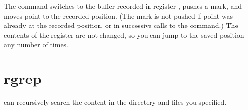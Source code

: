 The command  switches to the buffer recorded in register , pushes a mark, and moves point to the recorded position.
(The mark is not pushed if point was already at the recorded position, or in successive calls to the command.)
The contents of the register are not changed, so you can jump to the saved position any number of times.


\section{rgrep}
\label{sec:rgrep}

 can recursively search the content in the directory and files you specified.
